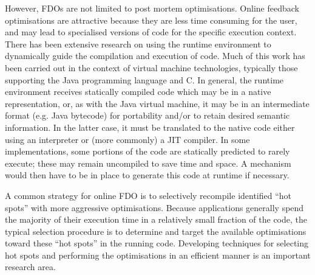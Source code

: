 However, \acp{FDO} are not limited to post mortem optimisations.
Online feedback optimisations are attractive because they are less time consuming for the user, and may lead to specialised versions of code for the specific execution context.
There has been extensive research on using the runtime environment to dynamically guide the compilation and execution of code.
Much of this work has been carried out in the context of virtual machine technologies, typically those supporting the Java programming language\cite{Alpern:2000:JVM:1011388.1011400} and C.
In general, the runtime environment receives statically compiled code which may be in a native representation, or, as with the Java virtual machine, it may be in an intermediate format (e.g. Java bytecode) for portability and/or to retain desired semantic information.
In the latter case, it must be translated to the native code either using an interpreter or (more commonly) a \ac{JIT} compiler.
In some implementations, some portions of the code are statically predicted to rarely execute; these may remain uncompiled to save time and space.
A mechanism would then have to be in place to generate this code at runtime if necessary.

A common strategy for online \ac{FDO} is to selectively recompile identified ``hot spots'' with more aggressive optimisations.
Because applications generally spend the majority of their execution time in a relatively small fraction of the code, the typical selection procedure is to determine and target the available optimisations toward these ``hot spots'' in the running code.
Developing techniques for selecting hot spots and performing the optimisations in an efficient manner is an important research area.





